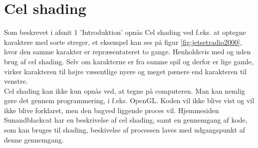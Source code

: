\section{Cel shading}
Som beskrevet i afsnit 1 'Introduktion' opnås Cel shading ved f.eks. at optegne karaktere med sorte streger, et eksempel kan ses på figur \ref{fig:jetsetradio2000}, hvor den samme karakter er repræsentateret to gange. Henholdsvis med og uden brug af cel shading. Selv om karakterne er fra samme spil og derfor er lige gamle, virker karakteren til højre væsentlige nyere og meget pænere end karakteren til venstre. 
\\
Cel shading kan ikke kun opnås ved, at tegne på computeren. Man kan nemlig gøre det gennem programmering, i f.eks. OpenGL. Koden vil ikke blive vist og vil ikke blive forklaret, men den bagved liggende proces vil. Hjemmesiden Sunandblackcat \cite{sunandblackcat2016} har en beskrivelse af cel shading, samt en gennemgang af kode, som kan bruges til shading, beskivelse af processen laves med udgangspunkt af denne gennemgang. 

